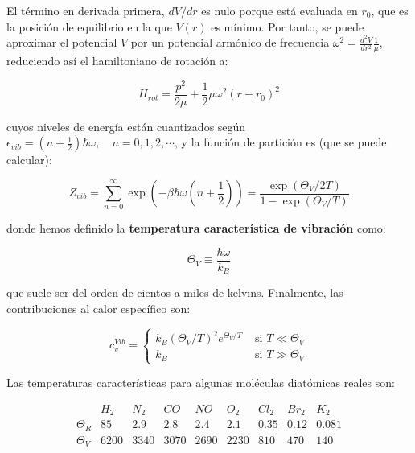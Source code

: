 \documentclass[11pt, a4paper]{article} %
\theoremstyle{named}
\begin{document}
            El término en derivada primera, $dV/dr$ es nulo porque está evaluada en $r_0$, que es la posición de equilibrio en la que $V(r)$ es mínimo. Por tanto, se puede aproximar el potencial $V$ por un potencial armónico de frecuencia $\omega^2= \frac{d^2 V}{dr^2}\frac{1}{\mu}$, reduciendo así el hamiltoniano de rotación a:

            $$
            H_{r o t}=\frac{p^{2}}{2 \mu}+\frac{1}{2} \mu \omega^{2}\left(r-r_{0}\right)^{2}
            $$

            cuyos niveles de energía están cuantizados según $\epsilon_{vib}=\left(n+\frac{1}{2}\right) \hbar \omega,\quad n=0,1,2, \cdots$, y la función de partición es (que se puede calcular):

            \begin{equation}\label{eq:diatZvib}
                Z_{vib}=\sum_{n=0}^{\infty} \exp \left(-\beta \hbar \omega\left(n+\frac{1}{2}\right)\right)=\frac{\exp \left(\Theta_{V} / 2 T\right)}{1-\exp \left(\Theta_{V} / T\right)}
            \end{equation}

            donde hemos definido la \textbf{temperatura característica de vibración} como:

            \begin{equation}\label{eq:diatTvib}
                \Theta_V \equiv \frac{\hbar \omega}{k_B}
            \end{equation}

            que suele ser del orden de cientos a miles de kelvins. Finalmente, las contribuciones al calor específico son:

            \begin{equation}\label{eq:diatCvib}
                c_{v}^{Vib}=\left\{\begin{array}{ll}
                k_{B}\left(\Theta_{V} / T\right)^{2} e^{\Theta_{V} / T} & \text { si } T \ll \Theta_{V} \\
                k_{B} & \text { si } T \gg \Theta_{V}
                \end{array}\right.
            \end{equation}

            Las temperaturas características para algunas moléculas diatómicas reales son:

            $$
            \begin{array}{c|cccccccc}
             &  H_2 &	N_2 &	CO &	NO &	O_2 &	Cl_2 &	Br_2 &	K_2 \\
             \hline
            \Theta_R &  85 &	2.9 &	2.8 &	2.4 &	2.1 &	0.35 &	0.12 &	0.081 \\
            \Theta_V  & 6200 &	3340 &	3070 &	2690 &	2230 &	810 &	470 &	140
            \end{array}
            $$
\end{document}
